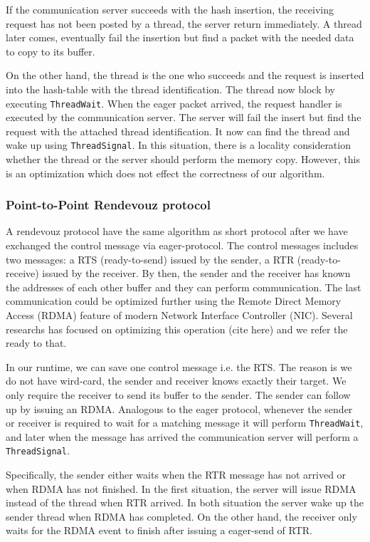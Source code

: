 \documentclass[11pt]{article}
\begin{document}
If the communication server succeeds with the hash insertion, the receiving
request has not been posted by a thread, the server return immediately. A
thread later comes, eventually fail the insertion but find a packet
with the needed data to copy to its buffer.

On the other hand, the thread is the one who succeeds and the request is
inserted into the hash-table with the thread identification. The thread now
block by executing \texttt{ThreadWait}. When the eager packet arrived, the request handler
is executed by the communication server. The server will fail the insert but
find the request with the attached thread identification. It now can 
find the thread and wake up using \texttt{ThreadSignal}. In this situation, there is a
locality consideration whether the thread or the server should perform the
memory copy. However, this is an optimization which does not effect the
correctness of our algorithm.

\subsubsection{Point-to-Point Rendevouz protocol}
A rendevouz protocol have the same algorithm as short protocol after we have
exchanged the control message via eager-protocol. The control messages 
includes two messages: a RTS (ready-to-send) issued by the sender, a RTR
(ready-to-receive) issued by the receiver. By then, the sender and the receiver
has known the addresses of each other buffer and they can perform
communication.  The last communication could be optimized further using the
Remote Direct Memory Access (RDMA) feature of modern Network Interface
Controller (NIC).  Several researchs has focused on optimizing this operation
(cite here) and we refer the ready to that.

In our runtime, we can save one control message i.e. the RTS.  The reason is
we do not have wird-card, the sender and receiver knows exactly their target.
We only require the receiver to send its buffer to the sender. The sender can
follow up by issuing an RDMA.  Analogous to the eager protocol, whenever the
sender or receiver is required to wait for a matching message it will perform
\texttt{ThreadWait}, and later when the message has arrived the communication server
will perform a \texttt{ThreadSignal}.

Specifically, the sender either waits when the RTR message has not arrived or
when RDMA has not finished. In the first situation, the server will issue RDMA
instead of the thread when RTR arrived. In both situation the server wake up
the sender thread when RDMA has completed. On the other hand, the receiver only
waits for the RDMA event to finish after issuing a eager-send of RTR.
\end{document}
